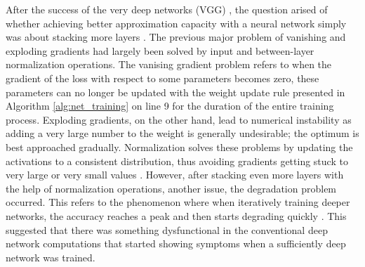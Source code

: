 \documentclass{article}
\begin{document}
After the success of the very deep networks (VGG) \cite{vgg}, the question arised of whether 
achieving better approximation capacity with a neural network simply was about stacking more layers \cite{resnet}.
The previous major problem of vanishing and exploding gradients had largely been solved by input and between-layer 
normalization operations. The vanising gradient problem refers to when the gradient of the loss with respect to 
some parameters becomes zero, these parameters can no longer be updated with the weight update rule presented in 
Algorithm \ref{alg:net_training} on line 9 for the duration of the entire training process. Exploding 
gradients, on the other hand, lead to numerical instability as adding a very large number to the weight is 
generally undesirable; the optimum is best approached gradually. Normalization solves these problems by 
updating the activations to a consistent distribution, thus avoiding gradients getting stuck to very large or very small values \cite{batchnorm}.
However, after stacking even more layers with the help of normalization operations, another issue, the degradation 
problem occurred. This refers to the phenomenon where when iteratively training deeper networks, the accuracy 
reaches a peak and then starts degrading quickly \cite{resnet}. This suggested that there was something dysfunctional in 
the conventional deep network computations that started showing symptoms when a sufficiently deep network was trained.
\end{document}
